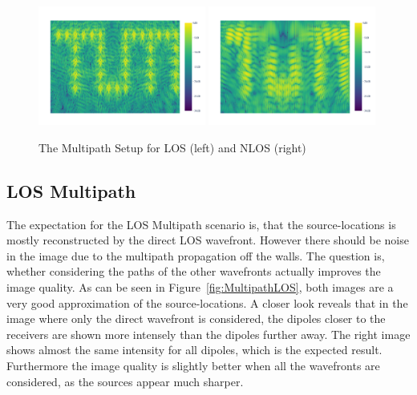 \begin{figure}[ht]
    \centering
    \includegraphics[page=3, width=0.49\textwidth]{figures/multipath_los_combined.pdf}
    \includegraphics[page=3, width=0.49\textwidth]{figures/multipath_nlos_combined.pdf}
    \caption{The Multipath Setup for LOS (left) and NLOS (right)}\label{fig:MultipathNLOS_setup}
\end{figure}

\subsection{LOS Multipath}
The expectation for the LOS Multipath scenario is, that the source-locations is mostly reconstructed by the direct LOS wavefront.
However there should be noise in the image due to the multipath propagation off the walls.
The question is, whether considering the paths of the other wavefronts actually improves the image quality.
As can be seen in Figure~\ref{fig:MultipathLOS}, both images are a very good approximation of the source-locations.
A closer look reveals that in the image where only the direct wavefront is considered, the dipoles closer to the receivers are shown more intensely than the dipoles further away.
The right image shows almost the same intensity for all dipoles, which is the expected result.
Furthermore the image quality is slightly better when all the wavefronts are considered, as the sources appear much sharper.

